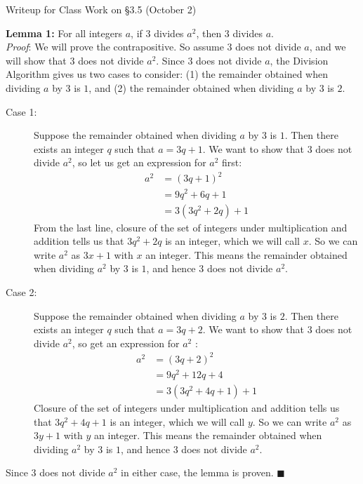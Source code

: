 \documentclass[11pt]{article}
\begin{document}
	
	\thispagestyle{empty}
	\renewcommand{\headrulewidth}{0.0pt}
	\thispagestyle{fancy}
	\lfoot{}
	\cfoot{}
	\rfoot{}	
	
	\vspace*{0in}

	
\begin{center}
	\begin{Large}
		Writeup for Class Work on \S3.5 (October 2)
	\end{Large}
	
\end{center}

\noindent
\textbf{Lemma 1:} For all integers $a$, if $3$ divides $a^2$, then $3$ divides $a$. \\

\noindent
\emph{Proof}: We will prove the contrapositive. So assume $3$ does not divide $a$, and we will show that $3$ does not divide $a^2$. Since $3$ does not divide $a$, the Division Algorithm gives us two cases to consider: (1) the remainder obtained when dividing $a$ by $3$ is $1$, and (2) the remainder obtained when dividing $a$ by $3$ is $2$. 

\begin{description}
	\item[Case 1:] Suppose the remainder obtained when dividing $a$ by $3$ is $1$. Then there exists an integer $q$ such that $a = 3q + 1$. We want to show that $3$ does not divide $a^2$, so let us get an expression for $a^2$ first: 
	\begin{align*}
		a^2 &= (3q + 1)^2 \\
		&= 9q^2 + 6q + 1 \\
		&= 3(3q^2 + 2q) + 1
	\end{align*}
From the last line, closure of the set of integers under multiplication and addition tells us that $3q^2 + 2q$ is an integer, which we will call $x$. So we can write $a^2$ as $3x + 1$ with $x$ an integer. This means the remainder obtained when dividing $a^2$ by $3$ is $1$, and hence $3$ does not divide $a^2$. 
	\item[Case 2:] Suppose the remainder obtained when dividing $a$ by $3$ is $2$. Then there exists an integer $q$ such that $a = 3q + 2$. We want to show that $3$ does not divide $a^2$, so get an expression for $a^2$ : 
	\begin{align*}
		a^2 &= (3q + 2)^2 \\
		&= 9q^2 + 12q + 4 \\
		&= 3(3q^2 + 4q + 1) + 1
	\end{align*}
Closure of the set of integers under multiplication and addition tells us that $3q^2 + 4q + 1$ is an integer, which we will call $y$. So we can write $a^2$ as $3y + 1$ with $y$ an integer. This means the remainder obtained when dividing $a^2$ by $3$ is $1$, and hence $3$ does not divide $a^2$.
\end{description}
Since $3$ does not divide $a^2$ in either case, the lemma is proven. \hfill $\blacksquare$
\end{document}
